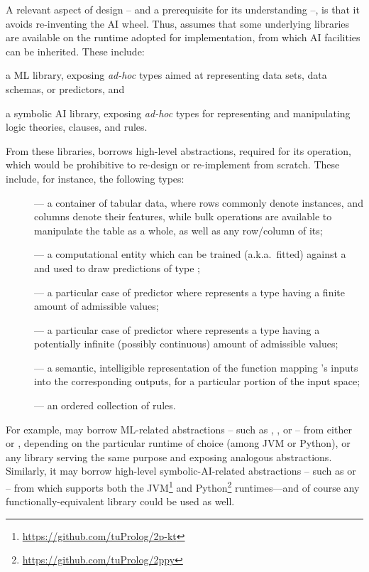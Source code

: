 \documentclass[12pt,a4paper,openright,twoside]{book}
\begin{document}
A relevant aspect of \psyke{} design -- and a prerequisite for its understanding --, is that it avoids re-inventing the AI wheel.
%
Thus, \psyke{} assumes that some underlying libraries are available on the runtime adopted for implementation, from which AI facilities can be inherited.
%
These include:
%
\begin{inlinelist}
    \item a ML library, exposing \emph{ad-hoc} types aimed at representing data sets, data schemas, or predictors, and
    \item a symbolic AI library, exposing \emph{ad-hoc} types for representing and manipulating logic theories, clauses, and rules.
\end{inlinelist}
%
From these libraries, \psyke{} borrows high-level abstractions, required for its operation, which would be prohibitive to re-design or re-implement from scratch.
%
These include, for instance, the following types:
%
\begin{description}
    \item[] --- a container of tabular data, where rows commonly denote instances, and columns denote their features, while bulk operations are available to manipulate the table as a whole, as well as any row/column of its;
    \item[] --- a computational entity which can be trained (a.k.a.\ fitted) against a  and used to draw predictions of type ;
    \item[] --- a particular case of predictor where  represents a type having a finite amount of admissible values;
    \item[] --- a particular case of predictor where  represents a type having a potentially infinite (possibly continuous) amount of admissible values;
    \item[] --- a semantic, intelligible representation of the function mapping 's inputs into the corresponding outputs, for a particular portion of the input space;
    \item[] --- an ordered collection of rules.
\end{description}
%
For example, \psyke{} may borrow ML-related abstractions -- such as , , or  -- from either \smile{} or \scikit{}, depending on the particular runtime of choice (among JVM or Python), or any library serving the same purpose and exposing analogous abstractions.
%
Similarly, it may borrow high-level symbolic-AI-related abstractions -- such as  or  -- from \twopkt{} \cite{cco-softwarex-2021-2pkt} which supports both the JVM\footnote{\url{https://github.com/tuProlog/2p-kt}} and Python\footnote{\url{https://github.com/tuProlog/2ppy}} runtimes---and of course any functionally-equivalent library could be used as well.
\end{document}
